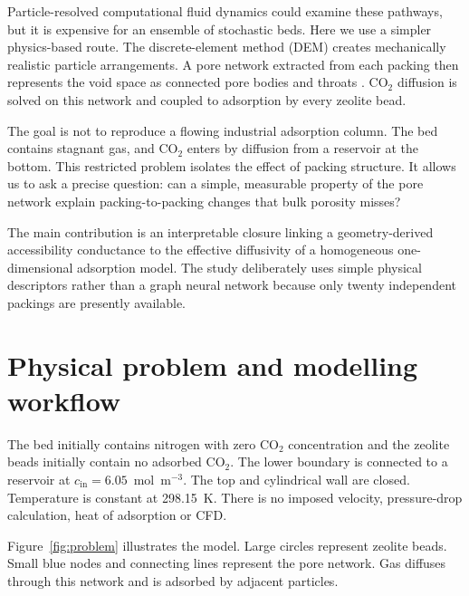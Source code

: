 \documentclass[11pt,a4paper]{article}
\begin{document}
Particle-resolved computational fluid dynamics could examine these pathways,
but it is expensive for an ensemble of stochastic beds. Here we use a simpler
physics-based route. The discrete-element method (DEM) creates mechanically
realistic particle arrangements. A pore network extracted from each packing
then represents the void space as connected pore bodies and throats
\cite{Blunt2017}. CO$_2$ diffusion is solved on this network and coupled to
adsorption by every zeolite bead.

The goal is not to reproduce a flowing industrial adsorption column. The bed
contains stagnant gas, and CO$_2$ enters by diffusion from a reservoir at the
bottom. This restricted problem isolates the effect of packing structure. It
allows us to ask a precise question: can a simple, measurable property of the
pore network explain packing-to-packing changes that bulk porosity misses?

The main contribution is an interpretable closure linking a geometry-derived
accessibility conductance to the effective diffusivity of a homogeneous
one-dimensional adsorption model. The study deliberately uses simple physical
descriptors rather than a graph neural network because only twenty independent
packings are presently available.

\section{Physical problem and modelling workflow}

The bed initially contains nitrogen with zero CO$_2$ concentration and the
zeolite beads initially contain no adsorbed CO$_2$. The lower boundary is
connected to a reservoir at $c_{\mathrm{in}}=6.05$~mol~m$^{-3}$. The top and
cylindrical wall are closed. Temperature is constant at 298.15~K. There is no
imposed velocity, pressure-drop calculation, heat of adsorption or CFD.

Figure~\ref{fig:problem} illustrates the model. Large circles represent
zeolite beads. Small blue nodes and connecting lines represent the pore network.
Gas diffuses through this network and is adsorbed by adjacent particles.
\end{document}
